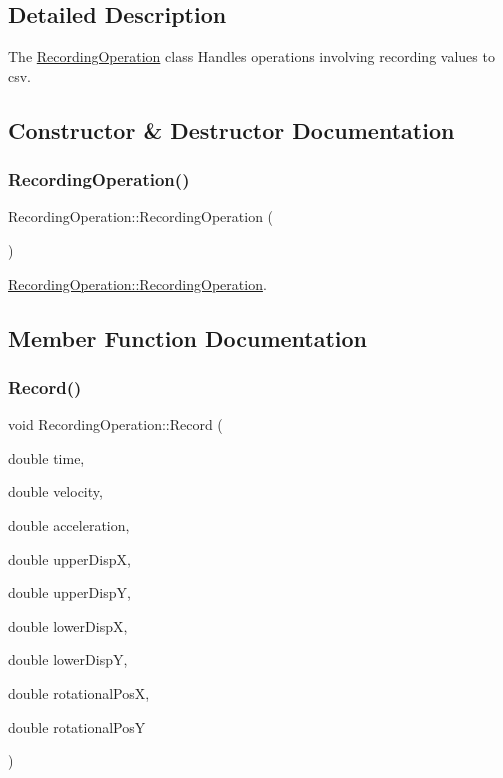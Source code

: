 \subsection{Detailed Description}
The \hyperlink{class_recording_operation}{Recording\+Operation} class Handles operations involving recording values to csv. 

\subsection{Constructor \& Destructor Documentation}
\hypertarget{class_recording_operation_a6335d0740c99799eb6cb094501019b07}{}\label{class_recording_operation_a6335d0740c99799eb6cb094501019b07} 
\subsubsection{\texorpdfstring{Recording\+Operation()}{RecordingOperation()}}
{\footnotesize\ttfamily Recording\+Operation\+::\+Recording\+Operation (\begin{DoxyParamCaption}{ }\end{DoxyParamCaption})}



\hyperlink{class_recording_operation_a6335d0740c99799eb6cb094501019b07}{Recording\+Operation\+::\+Recording\+Operation}. 



\subsection{Member Function Documentation}
\hypertarget{class_recording_operation_a1a341c41178b05e95bc434510dfeedca}{}\label{class_recording_operation_a1a341c41178b05e95bc434510dfeedca} 
\subsubsection{\texorpdfstring{Record()}{Record()}}
{\footnotesize\ttfamily void Recording\+Operation\+::\+Record (\begin{DoxyParamCaption}\item[{double}]{time,  }\item[{double}]{velocity,  }\item[{double}]{acceleration,  }\item[{double}]{upper\+DispX,  }\item[{double}]{upper\+DispY,  }\item[{double}]{lower\+DispX,  }\item[{double}]{lower\+DispY,  }\item[{double}]{rotational\+PosX,  }\item[{double}]{rotational\+PosY }\end{DoxyParamCaption})}



